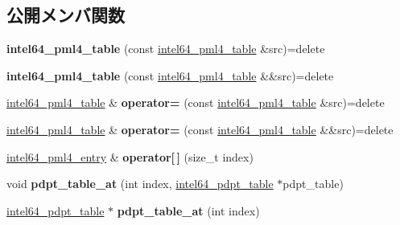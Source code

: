 \subsection*{公開メンバ関数}
\begin{DoxyCompactItemize}
\item 
\hypertarget{classintel64__pml4__table_aa6ec87ce70b16782b7aefa3e644bc7d5}{}{\bfseries intel64\+\_\+pml4\+\_\+table} (const \hyperlink{classintel64__pml4__table}{intel64\+\_\+pml4\+\_\+table} \&src)=delete\label{classintel64__pml4__table_aa6ec87ce70b16782b7aefa3e644bc7d5}

\item 
\hypertarget{classintel64__pml4__table_ac15155f86c99fb627ce4c2201f519eaa}{}{\bfseries intel64\+\_\+pml4\+\_\+table} (const \hyperlink{classintel64__pml4__table}{intel64\+\_\+pml4\+\_\+table} \&\&src)=delete\label{classintel64__pml4__table_ac15155f86c99fb627ce4c2201f519eaa}

\item 
\hypertarget{classintel64__pml4__table_a8c2591c5781c0db67ad0e44839f9d5a6}{}\hyperlink{classintel64__pml4__table}{intel64\+\_\+pml4\+\_\+table} \& {\bfseries operator=} (const \hyperlink{classintel64__pml4__table}{intel64\+\_\+pml4\+\_\+table} \&src)=delete\label{classintel64__pml4__table_a8c2591c5781c0db67ad0e44839f9d5a6}

\item 
\hypertarget{classintel64__pml4__table_a3f80097387464f4404300ba83c14eca4}{}\hyperlink{classintel64__pml4__table}{intel64\+\_\+pml4\+\_\+table} \& {\bfseries operator=} (const \hyperlink{classintel64__pml4__table}{intel64\+\_\+pml4\+\_\+table} \&\&src)=delete\label{classintel64__pml4__table_a3f80097387464f4404300ba83c14eca4}

\item 
\hypertarget{classintel64__pml4__table_a881b66a7e29b2568f0e91c158079e895}{}\hyperlink{classintel64__pml4__entry}{intel64\+\_\+pml4\+\_\+entry} \& {\bfseries operator\mbox{[}$\,$\mbox{]}} (size\+\_\+t index)\label{classintel64__pml4__table_a881b66a7e29b2568f0e91c158079e895}

\item 
\hypertarget{classintel64__pml4__table_ad908691745e01f82a122a41f714cce00}{}void {\bfseries pdpt\+\_\+table\+\_\+at} (int index, \hyperlink{classintel64__pdpt__table}{intel64\+\_\+pdpt\+\_\+table} $\ast$pdpt\+\_\+table)\label{classintel64__pml4__table_ad908691745e01f82a122a41f714cce00}

\item 
\hypertarget{classintel64__pml4__table_a68b892916fdb229f5257cb6c5647ea52}{}\hyperlink{classintel64__pdpt__table}{intel64\+\_\+pdpt\+\_\+table} $\ast$ {\bfseries pdpt\+\_\+table\+\_\+at} (int index)\label{classintel64__pml4__table_a68b892916fdb229f5257cb6c5647ea52}

\end{DoxyCompactItemize}
